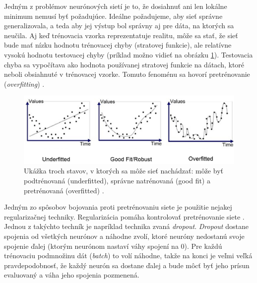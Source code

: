 Jedným z problémov neurónových sietí je to, že dosiahnuť ani len lokálne minimum nemusí byť požadujúce.
Ideálne požadujeme, aby sieť správne generalizovala, a teda aby jej výstup bol správny aj pre dáta, na ktorých sa neučila.
Aj keď trénovacia vzorka reprezentatuje realitu, môže sa stať, že sieť bude mať nízku hodnotu trénovacej chyby (stratovej funkcie), ale relatívne vysokú hodnotu testovacej chyby (príklad možno vidieť na obrázku \ref{overf}). Testovacia chyba sa vypočítava ako hodnota používanej stratovej funkcie na dátach, ktoré neboli obsiahnuté v trénovacej vzorke.
Tomuto fenoménu sa hovorí pretrénovanie (\textit{overfitting}) \citep{overfit}.
\noindent
\begin{figure} [h!]
\includegraphics[width=\textwidth]{../img/overfit.png} 
\caption{Ukážka troch stavov, v ktorých sa môže sieť nachádzať: môže byť podtrénovaná (underfitted), správne natrénovaná (good fit) a pretrénovaná (overfitted) \citep{gitgud}.} 
\label{overf}
\end{figure}

Jedným zo spôsobov bojovania proti pretrénovaniu siete je použitie nejakej regularizačnej techniky. 
Regularizácia pomáha kontrolovať pretrénovanie siete \citep{overfit}.
Jednou z takýchto techník je napríklad technika zvaná \textit{dropout}.
\textit{Dropout} dostane spojenia od všetkých neurónov a náhodne zvolí, ktoré neuróny nedostanú svoje spojenie ďalej (ktorým neurónom nastaví váhy spojení na 0). Pre každú trénovaciu podmnožinu dát (\textit{batch}) to volí náhodne, takže na konci je veľmi veľká pravdepodobnosť, že každý neurón sa dostane ďalej a bude môcť byť jeho prísun evaluovaný a váha jeho spojenia pozmenená.